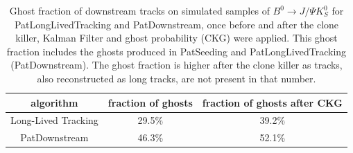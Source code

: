 \begin{table}[htp]
\caption{Ghost fraction of downstream tracks on simulated samples of $B^{0} \rightarrow J/\Psi K^{0}_{S}$ for PatLongLivedTracking and PatDownstream, once before and after the clone killer, Kalman Filter and ghost probability (CKG) were applied. This ghost fraction includes the ghosts produced in PatSeeding and PatLongLivedTracking (PatDownstream). The ghost fraction is higher after the clone killer as tracks, also reconstructed as long tracks, are not present in that number.}
\begin{center}
\begin{tabular}{c|c|c}
algorithm & fraction of ghosts & fraction of ghosts after CKG \\
\hline 
Long-Lived Tracking & 29.5\% & 39.2\%\\
PatDownstream & 46.3\% & 52.1\% \\
\end{tabular}
\end{center}
\label{tab:globGhostComp}
\end{table}%




